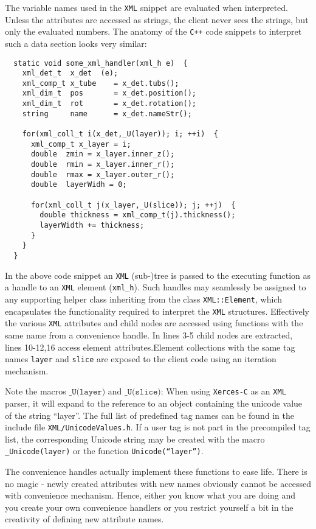 The variable names used in the \texttt{XML} snippet are evaluated when interpreted. Unless the attributes are accessed as strings, the client never sees the strings, but only the evaluated numbers. The anatomy of the \texttt{C++} code snippets to interpret such a data section looks very similar:
\begin{verbatim}
  static void some_xml_handler(xml_h e)  {
    xml_det_t  x_det  (e);
    xml_comp_t x_tube    = x_det.tubs();
    xml_dim_t  pos       = x_det.position();
    xml_dim_t  rot       = x_det.rotation();
    string     name      = x_det.nameStr();
      
    for(xml_coll_t i(x_det,_U(layer)); i; ++i)  {
      xml_comp_t x_layer = i;
      double  zmin = x_layer.inner_z();
      double  rmin = x_layer.inner_r();
      double  rmax = x_layer.outer_r();
      double  layerWidh = 0;
        
      for(xml_coll_t j(x_layer,_U(slice)); j; ++j)  {
        double thickness = xml_comp_t(j).thickness();
        layerWidth += thickness;
      }
    }
  }
\end{verbatim}
In the above code snippet an \texttt{XML} (sub-)tree is passed to the executing function as a handle to an \texttt{XML} element ({\texttt{xml\_h}}). Such handles may seamlessly be assigned to any supporting helper class inheriting from the class {\texttt{XML::Element}}, which encapsulates the functionality required to interpret the \texttt{XML} structures. Effectively the various \texttt{XML} attributes and child nodes are accessed using functions with the same name from a convenience handle. In lines 3-5 child nodes are extracted, lines 10-12,16 access element attributes.Element collections with the same tag names \texttt{layer} and \texttt{slice} are exposed to the client code using an iteration mechanism.

Note the macros $\texttt{\_U(layer)}$ and $\texttt{\_U(slice)}$:  When using \texttt{Xerces-C} as an \texttt{XML} parser, it will expand to the reference to an object containing the unicode value of the string ``layer''. The full list of predefined tag names can be found in the include file \texttt{XML/UnicodeValues.h}. If a user tag is not part in the precompiled tag list, the corresponding Unicode string may be created with the macro \texttt{\_Unicode(layer)} or the function \texttt{Unicode(``layer'')}.

The convenience handles actually implement these functions to ease life. There is no magic - newly created attributes with new names obviously cannot be accessed with convenience mechanism. Hence, either you know what you are doing and you create your own convenience handlers or you restrict yourself a bit in the creativity of defining new attribute names.

